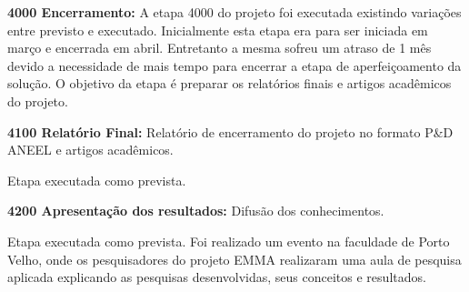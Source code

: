 \noindent
\textbf{4000 Encerramento:} A etapa 4000 do projeto foi executada existindo
variações entre previsto e executado. Inicialmente esta etapa era para ser
iniciada em março e encerrada em abril. Entretanto a mesma sofreu um atraso de 1
mês devido a necessidade de mais tempo para encerrar a etapa de aperfeiçoamento
da solução. O objetivo da etapa é preparar os relatórios finais e artigos acadêmicos do projeto.

\noindent
\textbf{4100 Relatório Final:} Relatório de encerramento do projeto no formato
P\&D ANEEL e artigos acadêmicos.

Etapa executada como prevista. 

\noindent
\textbf{4200 Apresentação dos resultados:} Difusão dos conhecimentos.

Etapa executada como prevista. Foi realizado um evento na faculdade de Porto
Velho, onde os pesquisadores do projeto EMMA realizaram uma aula de pesquisa
aplicada explicando as pesquisas desenvolvidas, seus conceitos e resultados.
 
